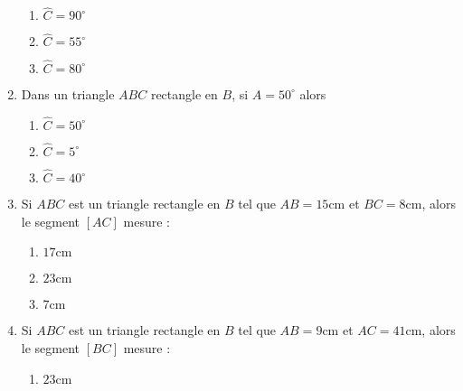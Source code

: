 \documentclass[oneside,twoside]{book}
\begin{document}
\begin{enumerate}
\begin{enumerate}

\item\MauvaiseReponse $\widehat{C}=90^{\circ}$

\item\MauvaiseReponse $\widehat{C}=55^{\circ}$

\item\BonneReponse $\widehat{C}=80^{\circ}$

\end{enumerate}


\item Dans un triangle $ABC$ rectangle en $B$, si $\widehat{A}=50^{\circ}$ alors

\begin{enumerate}

\item\MauvaiseReponse $\widehat{C}=50^{\circ}$

\item\MauvaiseReponse $\widehat{C}=5^{\circ}$

\item\BonneReponse $\widehat{C}=40^{\circ}$

\end{enumerate}



\item Si $ABC$ est un triangle rectangle en $B$ tel que $AB=15\mathrm{cm}$ et $BC=8\mathrm{cm}$, alors le segment $\left[AC\right]$ mesure :

\begin{enumerate}

\item\BonneReponse $17\mathrm{cm}$

\item\MauvaiseReponse $23\mathrm{cm}$

\item\MauvaiseReponse $7\mathrm{cm}$

\end{enumerate}



\item Si $ABC$ est un triangle rectangle en $B$ tel que $AB=9\mathrm{cm}$ et $AC=41\mathrm{cm}$, alors le segment $\left[BC\right]$ mesure :

\begin{enumerate}


\item\MauvaiseReponse $23\mathrm{cm}$


\end{enumerate}
\end{enumerate}
\end{document}
